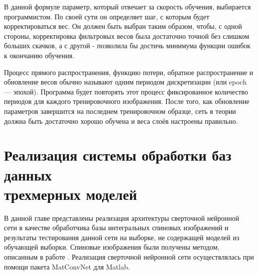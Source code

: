 \documentclass[14pt]{article}
\numberwithin{figure}{section}
\numberwithin{equation}{section}
\begin{document}
В данной формуле параметр, который отвечает за скорость обучения, выбирается программистом. По своей сути он определяет шаг, с которым будет корректироваться вес. Он должен быть выбран таким образом, чтобы, с одной стороны, корректировка фильтровых весов была достаточно точной без слишком больших скачков, а с другой - позволила бы достичь минимума функции ошибок к окончанию обучения.

Процесс прямого распространения, функцию потери, обратное распространение и обновление весов обычно называют одним периодом дискретизации (или epoch — эпохой). Программа будет повторять этот процесс фиксированное количество периодов для каждого тренировочного изображения. После того, как обновление параметров завершится на последнем тренировочном образце, сеть в теории должна быть достаточно хорошо обучена и веса слоёв настроены правильно.

\newpage

\section{Реализация системы обработки баз данных \\ трехмерных моделей}

В данной главе представлены реализация архитектуры сверточной нейронной сети в качестве обработчика базы интегральных спиновых изображений и результаты тестирования данной сети на выборке, не содержащей моделей из обучающей выборки. Спиновые изображения были получены методом, описанным в работе \cite{Chernikoff}. Реализация сверточной нейронной сети осуществлялась при помощи пакета MatConvNet для Matlab.


\end{document}
